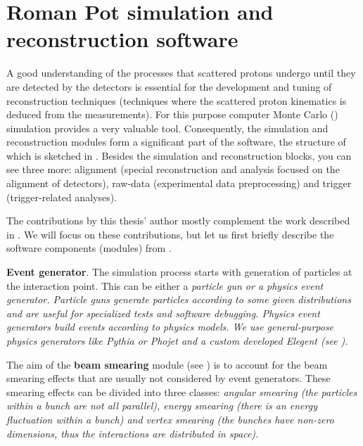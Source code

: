 \chapter[sr]{Roman Pot simulation and reconstruction software}


A good understanding of the processes that scattered protons undergo until they are detected by the  detectors is essential for the development and tuning of reconstruction techniques (techniques where the scattered proton kinematics is deduced from the  measurements). For this purpose computer Monte Carlo () simulation provides a very valuable tool. Consequently, the simulation and reconstruction modules form a significant part of the   software, the structure of which is sketched in . Besides the simulation and reconstruction blocks, you can see three more: alignment (special reconstruction and analysis focused on the alignment of  detectors), raw-data (experimental data preprocessing) and trigger (trigger-related analyses).

The contributions by this thesis' author mostly complement the work described in . We will focus on these contributions, but let us first briefly describe the software components (modules) from .

\> {\bf Event generator}.
The simulation process starts with generation of particles at the interaction point. This can be either a \em{particle gun} or a \em{physics event generator}. Particle guns generate particles according to some given distributions and are useful for specialized tests and software debugging. Physics event generators build events according to physics models. We use general-purpose physics generators like Pythia  or Phojet  and a custom developed Elegent (see ).

\> The aim of the {\bf beam smearing} module (see ) is to account for the beam smearing effects that are usually not considered by event generators. These smearing effects can be divided into three classes: \em{angular smearing} (the particles within a bunch are not all parallel), \em{energy smearing} (there is an energy fluctuation within a bunch) and \em{vertex smearing} (the bunches have non-zero dimensions, thus the interactions are distributed in space). 

